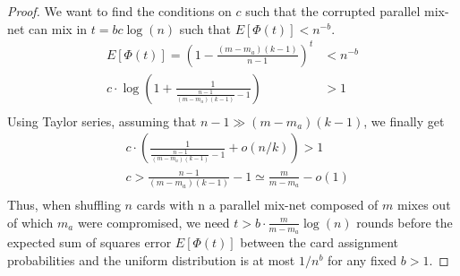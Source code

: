 \documentclass{llncs}
\begin{document}
\begin{proof}
We want to find the conditions on $c$ such that the corrupted parallel mix-net can mix in $t=bc\log(n)$  such that $E[\Phi(t)]< n^{-b}$.
\vspace{-.75em}
\begin{align*}
E[\Phi(t)] = (1-\frac{(m-m_a)(k-1)}{n-1})^t &< n^{-b}\\
c \cdot\log(1+ \frac{1}{\frac{n-1}{(m-m_a)(k-1)}- 1}) &> 1\\
\end{align*}
\vspace{-1em}
Using Taylor series, assuming that $n-1\gg(m-m_a)(k-1)$,  we finally get
\begin{align*}
&c \cdot (\frac{1}{\frac{n-1}{(m-m_a)(k-1)}- 1} +o(n/k)) > 1 \\
&c > \frac{n-1}{(m-m_a)(k-1)}- 1 \simeq \frac{m}{m-m_a} -o(1)\\
\end{align*}
Thus, when shuffling $n$ cards with n a parallel mix-net composed of $m$ mixes out of which $m_a$ were compromised, we need $t>b\cdot \frac{m}{m-m_a} \log(n) $ rounds before the expected sum of squares error $E[\Phi(t)]$ between the card assignment probabilities and the uniform distribution is at most $1/n^b$ for any fixed $b>1$.
\end{proof}
\end{document}
